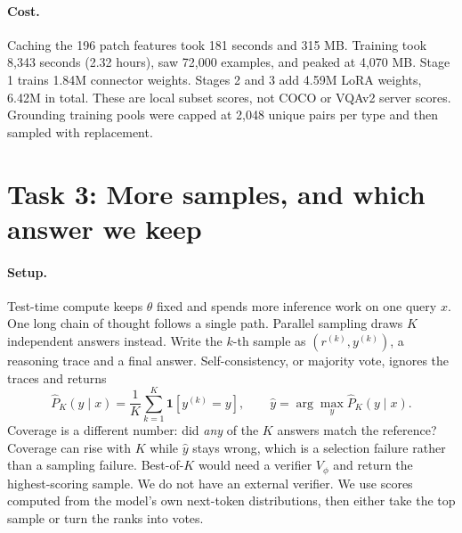 \documentclass[10pt]{article}
\begin{document}
\paragraph{Cost.}
Caching the 196 patch features took 181 seconds and 315 MB.
Training took 8{,}343 seconds (2.32 hours), saw 72{,}000 examples, and peaked at 4{,}070 MB.
Stage 1 trains 1.84M connector weights.
Stages 2 and 3 add 4.59M LoRA weights, 6.42M in total.
These are local subset scores, not COCO or VQAv2 server scores.
Grounding training pools were capped at 2{,}048 unique pairs per type and then sampled with replacement.

\section{Task 3: More samples, and which answer we keep}
\label{sec:ttc}

\paragraph{Setup.}
Test-time compute keeps $\theta$ fixed and spends more inference work on one query $x$.
One long chain of thought follows a single path.
Parallel sampling draws $K$ independent answers instead.
Write the $k$-th sample as $(r^{(k)}, y^{(k)})$, a reasoning trace and a final answer.
Self-consistency, or majority vote, ignores the traces and returns
\begin{equation}
\hat P_K(y\mid x)=\frac1K\sum_{k=1}^{K}\mathbf{1}[y^{(k)}=y],
\qquad
\hat y=\arg\max_y \hat P_K(y\mid x).
\label{eq:sc}
\end{equation}
Coverage is a different number: did \emph{any} of the $K$ answers match the reference?
Coverage can rise with $K$ while $\hat y$ stays wrong, which is a selection failure rather than a sampling failure.
Best-of-$K$ would need a verifier $V_{\phi}$ and return the highest-scoring sample.
We do not have an external verifier.
We use scores computed from the model's own next-token distributions, then either take the top sample or turn the ranks into votes.
\end{document}
